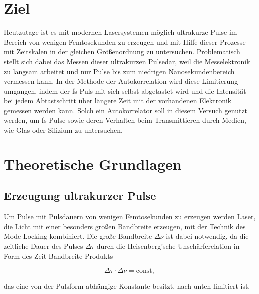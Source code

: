 \section{Ziel}
  Heutzutage ist es mit modernen Lasersystemen möglich ultrakurze Pulse im Bereich von wenigen Femtosekunden zu erzeugen und mit Hilfe dieser Prozesse mit Zeitskalen in der gleichen Größenordnung zu 
  untersuchen. Problematisch stellt sich dabei das Messen dieser ultrakurzen Pulsedar, weil die Messelektronik zu langsam arbeitet und nur Pulse bis zum niedrigen Nanosekundenbereich vermessen kann. In
  der Methode der Autokorrelation wird diese Limitierung umgangen, indem der fs-Puls mit sich selbst abgetastet wird und die Intensität bei jedem Abtastschritt über längere Zeit mit der vorhandenen 
  Elektronik gemessen werden kann. Solch ein Autokorrelator soll in diesem Versuch genutzt werden, um fs-Pulse sowie deren Verhalten beim Transmittieren durch Medien, wie Glas oder Silizium zu untersuchen.
    
\section{Theoretische Grundlagen}

  \subsection{Erzeugung ultrakurzer Pulse}
    Um Pulse mit Pulsdauern von wenigen Femtosekunden zu erzeugen werden Laser, die Licht mit einer besonders großen Bandbreite erzeugen, mit der Technik des Mode-Locking kombiniert. Die große Bandbreite
    $\Delta\nu$ ist dabei notwendig, da die zeitliche Dauer des Pulses $\Delta\tau$ durch die Heisenberg'sche Unschärferelation in Form des Zeit-Bandbreite-Produkts 
    
    \begin{equation}
      \Delta\tau \cdot \Delta\nu = \text{const},
    \end{equation}
    
    das eine von der Pulsform abhängige Konstante besitzt, nach unten limitiert ist.    


